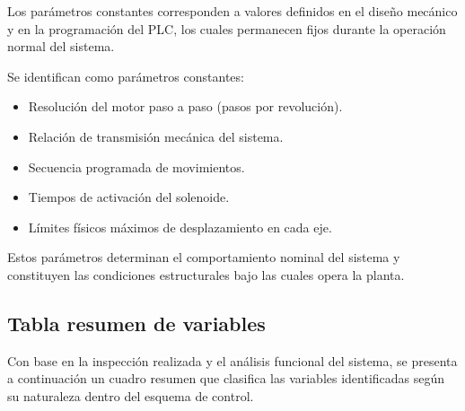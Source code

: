 \documentclass[a4paper,12pt]{article}
\begin{document}
Los parámetros constantes corresponden a valores definidos en el diseño mecánico y en la programación del PLC, los cuales permanecen fijos durante la operación normal del sistema.

Se identifican como parámetros constantes:

\begin{itemize}
    \item Resolución del motor paso a paso (pasos por revolución).
    \item Relación de transmisión mecánica del sistema.
    \item Secuencia programada de movimientos.
    \item Tiempos de activación del solenoide.
    \item Límites físicos máximos de desplazamiento en cada eje.
\end{itemize}

Estos parámetros determinan el comportamiento nominal del sistema y constituyen las condiciones estructurales bajo las cuales opera la planta.


\subsection{Tabla resumen de variables}

Con base en la inspección realizada y el análisis funcional del sistema, se presenta a continuación un cuadro resumen que clasifica las variables identificadas según su naturaleza dentro del esquema de control.
\end{document}
